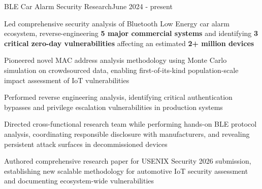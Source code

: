 \begin{joblong}{BLE Car Alarm Security Research}{June 2024 - present}
	\item Led comprehensive security analysis of Bluetooth Low Energy car alarm ecosystem, reverse-engineering \textbf{5 major commercial systems} and identifying \textbf{3 critical zero-day vulnerabilities} affecting an estimated \textbf{2+ million devices}
	\item Pioneered novel MAC address analysis methodology using Monte Carlo simulation on crowdsourced data, enabling first-of-its-kind population-scale impact assessment of IoT vulnerabilities
	\item Performed reverse engineering analysis, identifying critical authentication bypasses and privilege escalation vulnerabilities in production systems
	\item Directed cross-functional research team while performing hands-on BLE protocol analysis, coordinating responsible disclosure with manufacturers, and revealing persistent attack surfaces in decommissioned devices
	\item Authored comprehensive research paper for USENIX Security 2026 submission, establishing new scalable methodology for automotive IoT security assessment and documenting ecosystem-wide vulnerabilities
\end{joblong}
